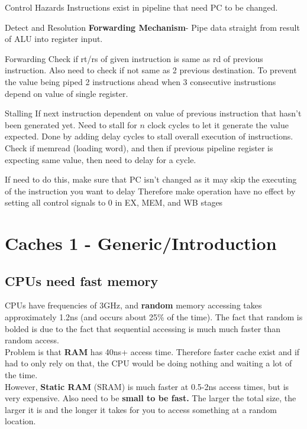 \documentclass{article}
\begin{document}
		Control Hazards
			Instructions exist in pipeline that need PC to be changed.

		Detect and Resolution
			\textbf{Forwarding Mechanism}- Pipe data straight from result of ALU into register input.

			Forwarding
				Check if rt/rs of given instruction is same as rd of previous instruction.
				Also need to check if not same as 2 previous destination. To prevent the value being piped 2 instructions ahead when 3 consecutive instrustions depend on value of single register.

			Stalling
				If next instruction dependent on value of previous instruction that hasn't been generated yet. 
				Need to stall for $n$ clock cycles to let it generate the value expected. 
				Done by adding delay cycles to stall overall execution of instructions.
				Check if memread (loading word), and then if previous pipeline register is expecting same value, then need to delay for a cycle.

				If need to do this, make sure that PC isn't changed as it may skip the executing of the instruction you want to delay
				Therefore make operation have no effect by setting all control signals to 0 in EX, MEM, and WB stages

				

\section*{Caches 1 - Generic/Introduction}
	\subsection*{CPUs need fast memory}
		CPUs have frequencies of 3GHz, and \textbf{random} memory accessing takes approximately 1.2ns (and occurs about 25\% of the time). The fact that random is bolded is due to the fact that sequential accessing is much much faster than random access.\\

		Problem is that \textbf{RAM} has 40ns+ access time. Therefore faster cache exist and if had to only rely on that, the CPU would be doing nothing and waiting a lot of the time.\\

		However, \textbf{Static RAM} (SRAM) is much faster at 0.5-2ns access times, but is very expensive. Also need to be \textbf{small to be fast.} The larger the total size, the larger it is and the longer it takes for you to access something at a random location.\\
\end{document}
